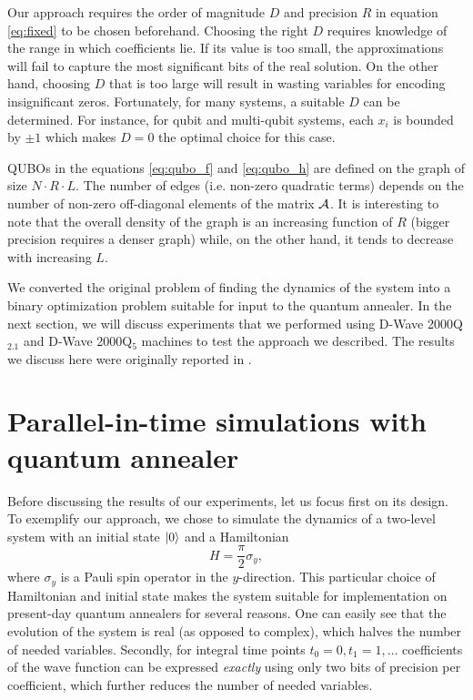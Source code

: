 Our approach requires the order of magnitude $D$ and precision $R$ in equation
\eqref{eq:fixed} to be chosen beforehand. Choosing the right $D$ requires
knowledge of the range in which coefficients lie. If its value is too small,
the approximations will fail to capture the most significant bits of the real
solution. On the other hand, choosing $D$ that is too large will result in
wasting variables for encoding insignificant zeros. Fortunately, for many
systems, a suitable $D$ can be determined. For instance, for qubit and
multi-qubit systems, each $x_i$ is bounded by $\pm 1$ which makes $D=0$ the
optimal choice for this case.

QUBOs in the equations \eqref{eq:qubo_f} and \eqref{eq:qubo_h} are defined on
the graph of size $N \cdot R \cdot L$. The number of edges (i.e. non-zero
quadratic terms) depends on the number of non-zero off-diagonal elements of the
matrix $\mathcal{A}$. It is interesting to note that the overall density of the
graph is an increasing function of $R$ (bigger precision requires a denser
graph) while, on the other hand, it tends to decrease with increasing $L$.

We converted the original problem of finding the dynamics of the system into a
binary optimization problem suitable for input to the quantum annealer. In the
next section, we will discuss experiments that we performed using D-Wave
2000Q$_{2.1}$ and D-Wave 2000Q$_5$ machines to test the approach we described.
The results we discuss here were originally reported in \cite{parallelintime}.

\section{Parallel-in-time simulations with quantum annealer}
Before discussing the results of our experiments, let us focus first on its
design. To exemplify our approach, we chose to simulate the dynamics of a
two-level system with an initial state $\ket{0}$ and a Hamiltonian
\begin{equation}
  H = \frac{\pi}{2}\sigma_y,
\end{equation}
where $\sigma_y$ is a Pauli spin operator in the
$y$-direction. This particular choice of Hamiltonian and initial state makes
the system suitable for implementation on present-day quantum annealers for
several reasons. One can easily see that the evolution of the system is real
(as opposed to complex), which halves the number of needed variables. Secondly,
for integral time points $t_0=0, t_1=1, \ldots$ coefficients of the wave
function can be expressed \emph{exactly} using only two bits of precision per
coefficient, which further reduces the number of needed variables.

